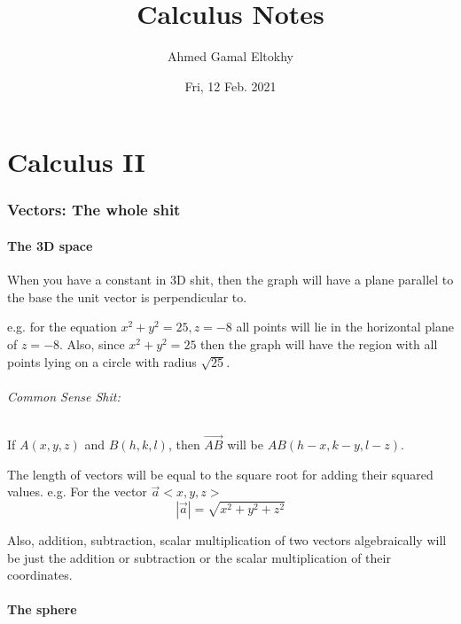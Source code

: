 \documentclass{article}
\title{Calculus Notes}
\date{Fri, 12 Feb. 2021}
\author{Ahmed Gamal Eltokhy}
\begin{document}
\maketitle
{}
\newpage

\tableofcontents
\newpage


\part{Calculus II}
\newpage

\section{Vectors: The whole shit}

\subsection{The 3D space}

When you have a constant in 3D shit, then the graph will have a plane parallel to the base the unit vector is perpendicular to.

e.g. for the equation $x^2+y^2=25, z=-8$ all points will lie in the horizontal plane of $z=-8$. Also, since $x^2+y^2=25$ then the graph will have the region with all points lying on a circle with radius $\sqrt{25}$.

\paragraph{Common Sense Shit:}

If $A(x,y,z)$ and $B(h,k,l)$, then $\vec{AB}$ will be $AB(h-x, k-y, l-z)$.

The length of vectors will be equal to the square root for adding their squared values. e.g. For the vector $\vec{a}<x,y,z>$
\begin{equation*}
	|\vec{a}| = \sqrt{x^2+y^2+z^2}
\end{equation*}

Also, addition, subtraction, scalar multiplication of two vectors algebraically will be just the addition or subtraction or the scalar multiplication of their coordinates.



\subsection{The sphere}
\end{document}

